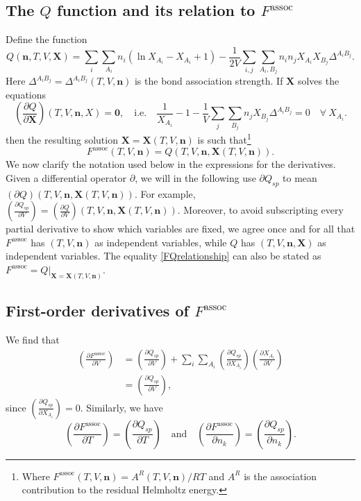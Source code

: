 \documentclass[english]{../thermomemo/thermomemo}
\newcommand{\mbf}[0]{\mathbf}
\newcommand*{\pder}[2]{\left(\frac{\partial #1}{\partial #2}\right)}
\newcommand{\lp}{\left(}
\newcommand{\rp}{\right)}
\begin{document}
\subsection{The $Q$ function and its relation to $F^{\text{assoc}}$}
Define the function
\begin{equation}
  Q(\mbf n,T,V,\mathbf{X}) = \sum_i \sum_{A_i} n_i \lp \ln X_{A_i} - X_{A_i} + 1\rp - \frac{1}{2V} \sum_{i,j} \sum_{A_i, B_j} n_i n_j X_{A_i} X_{B_j} \Delta^{A_i B_j}.
\end{equation}
Here $\Delta^{A_i B_j} = \Delta^{A_i B_j}(T,V,\mbf n)$ is the bond association
strength. If $\mbf X$ solves the equations
\begin{equation}
  \pder{Q}{\mbf X}(T,V,\mbf n,X) = \mbf 0, \quad \text{i.e.} \quad   \frac{1}{X_{A_i}} - 1 - \frac{1}{V} \sum_j \sum_{B_j} n_j X_{B_j} \Delta^{A_i B_j} = 0 \quad \forall \ X_{A_i}.
\end{equation}
then the resulting solution $\mbf X = \mbf X(T,V,\mbf n)$ is such
that\footnote{Where $F^{\text{assoc}}(T,V,\mbf n) = A^{R}(T,V,\mbf n)/RT$ and
  $A^R$ is the association contribution to the residual Helmholtz energy.}
\begin{equation}
  \label{FQrelationship}
  F^{\text{assoc}}(T,V,\mbf n) = Q(T,V,\mbf n, \mbf X(T,V,\mbf n)).
\end{equation}
We now clarify the notation used below in the expressions for the
derivatives. Given a differential operator $\partial$, we will in the following
use $\partial Q_{sp}$ to mean $(\partial Q)(T,V,\mbf n,\mbf X(T,V,\mbf n))$. For
example, $\pder{Q_{sp}}{V} = \pder{Q}{V}(T,V,\mbf n,\mbf X(T,V,\mbf
n))$. Moreover, to avoid subscripting every partial derivative to show which
variables are fixed, we agree once and for all that $F^{\text{assoc}}$ has
$(T,V,\mbf n)$ as independent variables, while $Q$ has $(T,V,\mbf n,\mbf X)$ as
independent variables. The equality \eqref{FQrelationship} can also be stated as
$F^{\text{assoc}} = Q|_{\mbf X = \mbf X(T,V,\mbf n)}$.

\subsection{First-order derivatives of $F^{\text{assoc}}$} \label{first-order derivatives}
We find that
\begin{align*}
\pder{F^{\text{assoc}}}{V} &= \pder{Q_{sp}}{V}  + \sum_i \sum_{A_i} \pder{Q_{sp}}{X_{A_i}} \pder{X_{A_i}}{V} \\
& = \pder{Q_{sp}}{V},
\end{align*}
since $\pder{Q_{sp}}{X_{A_i}} = 0$. Similarly, we have
$$
\pder{F^{\text{assoc}}}{T} = \pder{Q_{sp}}{T} \quad \text{and} \quad \pder{F^{\text{assoc}}}{n_k} = \pder{Q_{sp}}{n_k}.
$$
\end{document}
